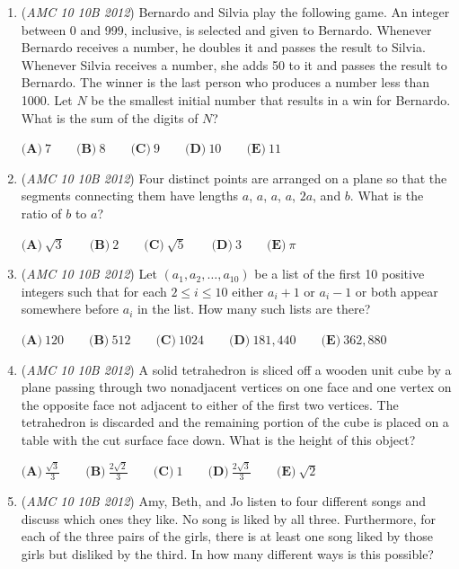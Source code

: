\begin{enumerate}
	\item (\textit{AMC 10 10B 2012}) Bernardo and Silvia play the following game. An integer between 0 and 999, inclusive, is selected and given to Bernardo. Whenever Bernardo receives a number, he doubles it and passes the result to Silvia. Whenever Silvia receives a number, she adds 50 to it and passes the result to Bernardo. The winner is the last person who produces a number less than 1000. Let $N$ be the smallest initial number that results in a win for Bernardo. What is the sum of the digits of $N$?


 $\textbf{(A)}\ 7\qquad\textbf{(B)}\ 8\qquad\textbf{(C)}\ 9\qquad\textbf{(D)}\ 10\qquad\textbf{(E)}\ 11$


	\item (\textit{AMC 10 10B 2012}) Four distinct points are arranged on a plane so that the segments connecting them have lengths $a$, $a$, $a$, $a$, $2a$, and $b$. What is the ratio of $b$ to $a$?


 $\textbf{(A)}\ \sqrt{3}\qquad\textbf{(B)}\ 2\qquad\textbf{(C)}\ \sqrt{5}\qquad\textbf{(D)}\ 3\qquad\textbf{(E)}\ \pi$


	\item (\textit{AMC 10 10B 2012}) Let $(a_1,a_2, \dots ,a_{10})$ be a list of the first 10 positive integers such that for each $2 \le i \le 10$ either $a_i+1$ or $a_i-1$ or both appear somewhere before $a_i$ in the list. How many such lists are there?


 $\textbf{(A)}\ 120\qquad\textbf{(B)}\ 512\qquad\textbf{(C)}\ 1024\qquad\textbf{(D)}\ 181,440\qquad\textbf{(E)}\ 362,880$


	\item (\textit{AMC 10 10B 2012}) A solid tetrahedron is sliced off a wooden unit cube by a plane passing through two nonadjacent vertices on one face and one vertex on the opposite face not adjacent to either of the first two vertices. The tetrahedron is discarded and the remaining portion of the cube is placed on a table with the cut surface face down. What is the height of this object?


 $\textbf{(A)}\ \frac{\sqrt{3}}{3}\qquad\textbf{(B)}\ \frac{2\sqrt{2}}{3}\qquad\textbf{(C)}\ 1\qquad\textbf{(D)}\ \frac{2\sqrt{3}}{3}\qquad\textbf{(E)}\ \sqrt{2}$


	\item (\textit{AMC 10 10B 2012}) Amy, Beth, and Jo listen to four different songs and discuss which ones they like. No song is liked by all three. Furthermore, for each of the three pairs of the girls, there is at least one song liked by those girls but disliked by the third. In how many different ways is this possible?



\end{enumerate}
